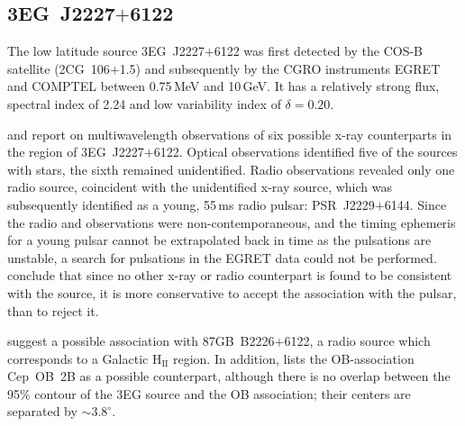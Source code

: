 \subsection{3EG~J2227$+$6122}

The low latitude \Gray source 3EG~J2227$+$6122 was first detected by
the COS-B satellite (2CG~106$+$1.5) and subsequently by the CGRO
instruments EGRET and COMPTEL between 0.75\,MeV and 10\,GeV. It has a
relatively strong flux, spectral index of 2.24 and low variability
index of $\delta=0.20$.

\citet{REF::HALPERN::APJ2001::2227PAPER1} and 
\citet{REF::HALPERN::APJ2001::2227PAPER2} report on multiwavelength 
observations of six possible x-ray counterparts in the region of
3EG~J2227$+$6122. Optical observations identified five of the sources
with stars, the sixth remained unidentified. Radio observations
revealed only one radio source, coincident with the unidentified x-ray
source, which was subsequently identified as a young, 55\,ms radio
pulsar: PSR~J2229$+$6144. Since the radio and \Gray observations were
non-contemporaneous, and the timing ephemeris for a young pulsar
cannot be extrapolated back in time as the pulsations are unstable, a
search for pulsations in the EGRET data could not be performed.
\citet{REF::HALPERN::APJ2001::2227PAPER2} conclude that 
since no other x-ray or radio counterpart is found to be consistent
with the \Gray source, it is more conservative to accept the
association with the pulsar, than to reject it.

\citet{REF::MATTOX::APJS2001} suggest a possible association with
87GB~B2226$+$6122, a radio source which corresponds to a Galactic
$\mathrm{H_{II}}$ region. In addition, \citet{REF::ROMERO::AA1999} lists
the OB-association Cep~OB~2B as a possible counterpart, although there
is no overlap between the 95\% contour of the 3EG source and the
OB association; their centers are separated by $\sim3.8^\circ$.

